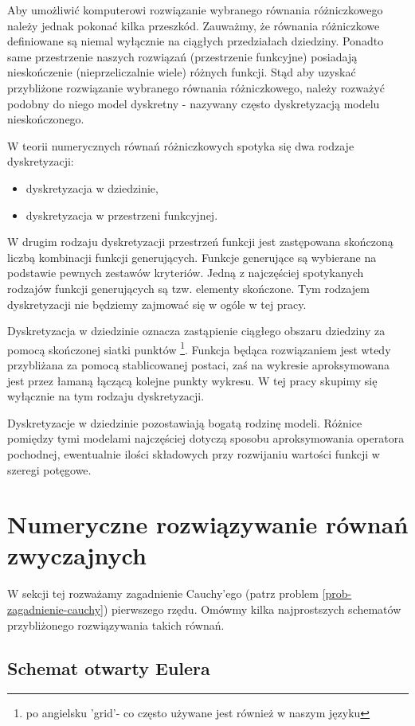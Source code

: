 \documentclass[12pt,a4paper]{report}
\begin{document}
Aby umożliwić komputerowi rozwiązanie wybranego równania różniczkowego należy jednak pokonać kilka przeszkód. Zauważmy, że równania różniczkowe definiowane są niemal wyłącznie na ciągłych przedziałach dziedziny. Ponadto same przestrzenie naszych rozwiązań (przestrzenie funkcyjne) posiadają nieskończenie (nieprzeliczalnie wiele) różnych funkcji. Stąd aby uzyskać przybliżone rozwiązanie wybranego równania różniczkowego, należy rozważyć podobny do niego model dyskretny - nazywany często dyskretyzacją modelu nieskończonego. 

W teorii numerycznych równań różniczkowych spotyka się dwa rodzaje dyskretyzacji:
\begin{itemize}
\item dyskretyzacja w dziedzinie,
\item dyskretyzacja w przestrzeni funkcyjnej.
\end{itemize}

W drugim rodzaju dyskretyzacji przestrzeń funkcji jest zastępowana skończoną liczbą kombinacji funkcji generujących. Funkcje generujące są wybierane na podstawie pewnych zestawów kryteriów. Jedną z najczęściej spotykanych rodzajów funkcji generujących są tzw. elementy skończone. Tym rodzajem dyskretyzacji nie będziemy zajmować się w ogóle w tej pracy.

Dyskretyzacja w dziedzinie oznacza zastąpienie ciągłego obszaru dziedziny za pomocą skończonej siatki punktów \footnote{po angielsku 'grid'- co często używane jest również w naszym języku}. Funkcja będąca rozwiązaniem jest wtedy przybliżana za pomocą stablicowanej postaci, zaś na wykresie aproksymowana jest przez łamaną łączącą kolejne punkty wykresu. W tej pracy skupimy się wyłącznie na tym rodzaju dyskretyzacji. 

Dyskretyzacje w dziedzinie pozostawiają bogatą rodzinę modeli. Różnice pomiędzy tymi modelami najczęściej dotyczą sposobu aproksymowania operatora pochodnej, ewentualnie ilości składowych przy rozwijaniu wartości funkcji w szeregi potęgowe. 


\section{Numeryczne rozwiązywanie równań zwyczajnych}

W sekcji tej rozważamy zagadnienie Cauchy'ego (patrz problem \ref{prob-zagadnienie-cauchy}) pierwszego rzędu. Omówmy kilka najprostszych schematów przybliżonego rozwiązywania takich równań.

\subsection{Schemat otwarty Eulera}
\end{document}

